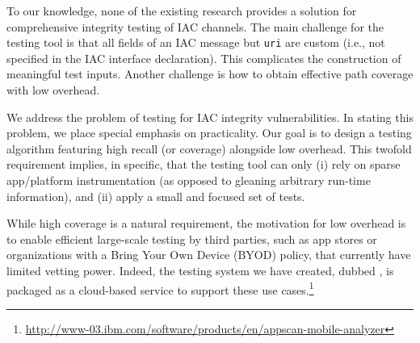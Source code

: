 To our knowledge, none of the existing research provides a solution for comprehensive integrity testing of IAC channels. The main challenge for the testing tool is that all fields of an IAC message but {\tt uri} are custom (i.e., not specified in the IAC interface declaration). This complicates the construction of meaningful test inputs. Another challenge is how to obtain effective path coverage with low overhead.

%

 We address the problem of testing for IAC integrity vulnerabilities. In stating this problem, we place special emphasis on practicality. Our goal is to design a testing algorithm featuring high recall (or coverage) alongside low overhead. This twofold requirement implies, in specific, that the testing tool can only (i) rely on sparse app/platform instrumentation (as opposed to gleaning arbitrary run-time information), and (ii) apply a small and focused set of tests.

While high coverage is a natural requirement, the motivation for low overhead is to enable efficient large-scale testing by third parties, such as app stores or organizations with a Bring Your Own Device (BYOD) policy, that currently have limited vetting power. Indeed, the testing system we have created, dubbed \Tool, is packaged as a cloud-based service to support these use cases.\footnote{
	\url{http://www-03.ibm.com/software/products/en/appscan-mobile-analyzer}
}

